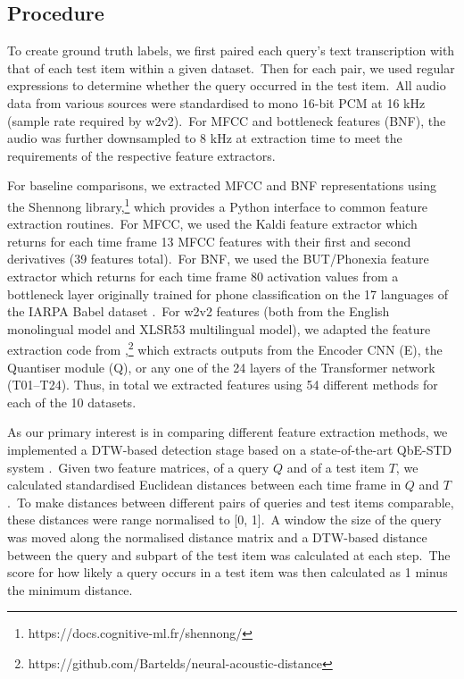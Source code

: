 \documentclass[main.tex]{subfiles}
\begin{document}
\subsection{Procedure}

To create ground truth labels, we first paired each query's text transcription with that of each test item within a given dataset.~Then for each pair, we used regular expressions to determine whether the query occurred in the test item.~All audio data from various sources were standardised to mono 16-bit PCM at 16 kHz (sample rate required by w2v2).~For MFCC and bottleneck features (BNF), the audio was further downsampled to 8 kHz at extraction time to meet the requirements of the respective feature extractors.

For baseline comparisons, we extracted MFCC and BNF representations using the Shennong library,\footnote{https://docs.cognitive-ml.fr/shennong/} which provides a Python interface to common feature extraction routines.~For MFCC, we used the Kaldi feature extractor which returns for each time frame 13 MFCC features with their first and second derivatives (39 features total).~For BNF, we used the BUT/Phonexia feature extractor which returns for each time frame 80 activation values from a bottleneck layer originally trained for phone classification on the 17 languages of the IARPA Babel dataset \parencite{silnovaPhonexiaBottleneckFeature2018}.~For w2v2 features (both from the English monolingual model and XLSR53 multilingual model), we adapted the feature extraction code from \textcite{bartelds2022neural},\footnote{https://github.com/Bartelds/neural-acoustic-distance} which extracts outputs from the Encoder CNN (E), the Quantiser module (Q), or any one of the 24 layers of the Transformer network (T01--T24).
Thus, in total we extracted features using 54 different methods for each of the 10 datasets.

As our primary interest is in comparing different feature extraction methods, we implemented a DTW-based detection stage based on a state-of-the-art QbE-STD system \parencite{rodriguez-fuentesHighperformanceQuerybyexampleSpoken2014}.~Given two feature matrices, of a query $Q$ and of a test item $T$, we calculated standardised Euclidean distances between each time frame in $Q$ and $T$.~To make distances between different pairs of queries and test items comparable, these distances were range normalised to [0, 1].~A window the size of the query was moved along the normalised distance matrix and a DTW-based distance between the query and subpart of the test item was calculated at each step.~The score for how likely a query occurs in a test item was then calculated as 1 minus the minimum distance.
\end{document}
